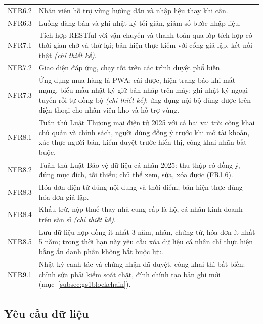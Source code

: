 \begin{longtable}{L{1.40cm} L{13.50cm}}
NFR6.2 & Nhân viên hỗ trợ vùng hướng dẫn và nhập liệu thay khi cần. \\
NFR6.3 & Luồng đăng bán và ghi nhật ký tối giản, giảm số bước nhập liệu. \\
NFR7.1 & Tích hợp RESTful với vận chuyển và thanh toán qua lớp tích hợp có thời gian chờ và thử lại; bản hiện thực kiểm với cổng giả lập, kết nối thật \emph{(chỉ thiết kế)}. \\
NFR7.2 & Giao diện đáp ứng, chạy tốt trên các trình duyệt phổ biến. \\
NFR7.3 & Ứng dụng mua hàng là PWA: cài được, hiện trang báo khi mất mạng, biểu mẫu nhật ký giữ bản nháp trên máy; ghi nhật ký ngoại tuyến rồi tự đồng bộ \emph{(chỉ thiết kế)}; ứng dụng nội bộ dùng được trên điện thoại cho nhân viên kho và hỗ trợ vùng. \\
NFR8.1 & Tuân thủ Luật Thương mại điện tử 2025 với cả hai vai trò: công khai chủ quản và chính sách, người dùng đồng ý trước khi mở tài khoản, xác thực người bán, kiểm duyệt trước hiển thị, công khai nhãn bắt buộc. \\
NFR8.2 & Tuân thủ Luật Bảo vệ dữ liệu cá nhân 2025: thu thập có đồng ý, đúng mục đích, tối thiểu; chủ thể xem, sửa, xóa được (FR1.6). \\
NFR8.3 & Hóa đơn điện tử đúng nội dung và thời điểm; bản hiện thực dùng hóa đơn giả lập. \\
NFR8.4 & Khấu trừ, nộp thuế thay nhà cung cấp là hộ, cá nhân kinh doanh trên sàn sỉ \emph{(chỉ thiết kế)}. \\
NFR8.5 & Lưu dữ liệu hợp đồng ít nhất 3 năm, nhãn, chứng từ, hóa đơn ít nhất 5 năm; trong thời hạn này yêu cầu xóa dữ liệu cá nhân chỉ thực hiện bằng ẩn danh phần không bắt buộc lưu. \\
NFR9.1 & Nhật ký canh tác và chứng nhận đã duyệt, công khai thì bất biến: chỉnh sửa phải kiểm soát chặt, đính chính tạo bản ghi mới (mục~\ref{subsec:gs1blockchain}). \\
\end{longtable}
\endgroup

\subsection{Yêu cầu dữ liệu}
\label{subsec:yeucaudulieu}

